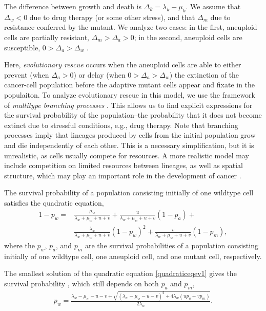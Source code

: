 \documentclass[12pt]{extarticle}
\begin{document}
The difference between growth and death is $\Delta_k = \lambda_k-\mu_k$.
We assume that $\Delta_w<0$ due to drug therapy (or some other stress), and that $\Delta_m$ due to resistance conferred by the mutant.
We analyze two cases: in the first, aneuploid cells are partially resistant, $\Delta_m>\Delta_a>0$; in the second, aneuploid cells are susceptible, $0>\Delta_a>\Delta_w$  \cite{brauner2016distinguishing}.

Here, \emph{evolutionary rescue} occurs when the aneuploid cells are able to either prevent (when $\Delta_a>0$) or delay (when $0>\Delta_a>\Delta_w$) the extinction of the cancer-cell population before the adaptive mutant cells appear and fixate in the populaiton.
To analyze evolutionary rescue in this model, we use the framework of \emph{multitype branching processes} \cite{rybnikov2021fitness,harris1963theory}. 
This allows us to find explicit expressions for the survival probability of the population--the probability that it does not become extinct due to stressful conditions, e.g., drug therapy.
Note that branching processes imply that lineages produced by cells from the initial population grow and die independently of each other.
This is a necessary simplification, but it is unrealistic, as cells usually compete for resources.
A more realistic model may include competition on limited resources between lineages, as well as spatial structure, which may play an important role in the development of cancer \cite{martens2011spatial}.

The survival probability of a population consisting initially of one wildtype cell satisfies the quadratic equation,
\begin{equation} \label{quadraticeqev1}
\begin{aligned}
1-p_w = & \frac{\mu_w}{\lambda_w+\mu_w+u+v} + 
		  \frac{u}{\lambda_w+\mu_w+u+v}\left(1-p_a\right) + \\
		  & \frac{\lambda_w}{\lambda_w+\mu_w+u+v}\left(1-p_w\right)^2 +
		  \frac{v}{\lambda_w+\mu_w+u+v}\left(1-p_m\right) ,
\end{aligned}
\end{equation}
where the $p_w$, $p_a$, and $p_m$ are the survival probabilities of a population consisting initially of one wildtype cell, one aneuploid cell, and one mutant cell, respectively.

The smallest solution of the quadratic equation \cref{quadraticeqev1} gives the survival probability \cite{uecker2015adaptive}, which still depends on both $p_a$ and $p_m$,
\begin{align}\label{survprobw}
p_w=\frac{\lambda_w-\mu_w-u-v+\sqrt{\left(\lambda_w-\mu_w-u-v\right)^2+4\lambda_w\left(up_a+vp_m\right)}}{2\lambda_w} .
\end{align}
\end{document}

